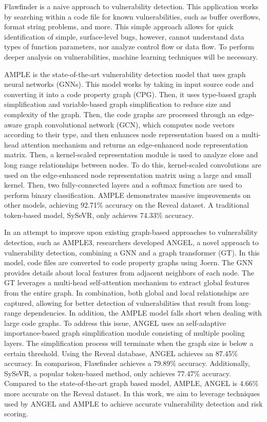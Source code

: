 \documentclass{article}
\begin{document}
Flawfinder is a naive approach to vulnerability detection. This application works by searching within a code file for known vulnerabilities, such as buffer overflows, format string problems, and more. This simple approach allows for quick identification of simple, surface-level bugs, however, cannot understand data types of function parameters, nor analyze control flow or data flow. To perform deeper analysis on vulnerabilities, machine learning techniques will be necessary.


AMPLE is the state-of-the-art vulnerability detection model that uses graph neural networks (GNNs). This model works by taking in input source code and converting it into a code property graph (CPG). Then, it uses type-based graph simplification and variable-based graph simplification to reduce size and complexity of the graph. Then, the code graphs are processed through an edge-aware graph convolutional network (GCN), which computes node vectors according to their type, and then enhances node representation based on a multi-head attention mechanism and returns an edge-enhanced node representation matrix. Then, a kernel-scaled representation module is used to analyze close and long range relationships between nodes. To do this, kernel-scaled convolutions are used on the edge-enhanced node representation matrix using a large and small kernel. Then, two fully-connected layers and a softmax function are used to perform binary classification. AMPLE demonstrates massive improvements on other models, achieving 92.71\% accuracy on the Reveal dataset. A traditional token-based model, SySeVR, only achieves 74.33\% accuracy. 

In an attempt to improve upon existing graph-based approaches to vulnerability detection, such as AMPLE3, researchers developed ANGEL\cite{wen2023vulnerabilitydetectiongraphsimplification}, a novel approach to vulnerability detection, combining a GNN and a graph transformer (GT). In this model, code files are converted to code property graphs using Joern\cite{6956589}. The GNN provides details about local features from adjacent neighbors of each node. The GT leverages a multi-head self-attention mechanism to extract global features from the entire graph. In combination, both global and local relationships are captured, allowing for better detection of vulnerabilities that result from long-range dependencies. In addition, the AMPLE model falls short when dealing with large code graphs. To address this issue, ANGEL uses an self-adaptive importance-based graph simplification module consisting of multiple pooling layers. The simplification process will terminate when the graph size is below a certain threshold. Using the Reveal database, ANGEL achieves an 87.45\% accuracy. In comparison, Flawfinder achieves a 79.89\% accuracy. Additionally, SySeVR, a popular token-based method, only achieves 77.47\% accuracy. Compared to the state-of-the-art graph based model, AMPLE, ANGEL is 4.66\% more accurate on the Reveal dataset. In this work, we aim to leverage techniques used by ANGEL and AMPLE to achieve accurate vulnerability detection and risk scoring.
\end{document}
